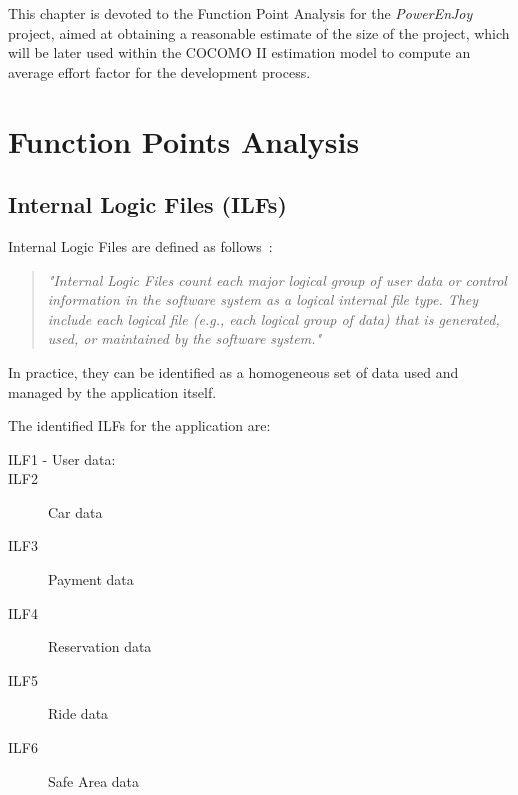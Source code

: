 This chapter is devoted to the Function Point Analysis for the \textit{PowerEnJoy} project, aimed at obtaining a reasonable estimate of the size of the project, which will be later used within the COCOMO II estimation model to compute an average effort factor for the development process.

\section{Function Points Analysis}
\subsection{Internal Logic Files (ILFs)}
Internal Logic Files are defined as follows~\cite{cocomo-manual}:
\begin{quotation}
\textit{"Internal Logic Files count each major logical group of user data or control information in the software system as a logical internal file type. They include each logical file (e.g., each logical group of data) that is generated, used, or maintained by the software system."}
\end{quotation}
\noindent
In practice, they can be identified as a homogeneous set of data used and managed by the application itself.

The identified ILFs for the application are:
\begin{description}
\item[ILF1 - User data:] %
\item[ILF2] Car data 	%
\item[ILF3] Payment data	%
\item[ILF4] Reservation data	%
\item[ILF5] Ride data	%
\item[ILF6] Safe Area data	%
\end{description}

